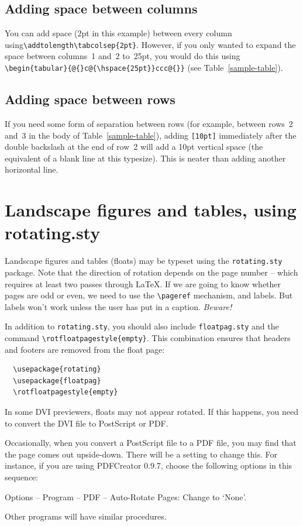 \subsection{Adding space between columns}
\label{addhoriz}
You can add space (2pt in this example) between every column using\linebreak \verb"\addtolength\tabcolsep{2pt}". However, if you only wanted to expand the space between columns~1 and~2 to~25pt, you would do this using \verb"\begin{tabular}{@{}c@{\hspace{25pt}}ccc@{}}" (see Table~\ref{sample-table}).

\subsection{Adding space between rows}
If you need some form of separation between rows (for example, between rows~2 and~3 in the body of Table~\ref{sample-table}), adding \verb"[10pt]" immediately after the double backslash at the end of row~2 will add a 10pt vertical space (the equivalent of a blank line at this typesize). This is neater than adding another horizontal line.


\section{Landscape figures and tables, using rotating.sty}

Landscape figures and tables (floats) may be typeset using the \verb"rotating.sty" package. Note that the direction of rotation depends on the page number -- which requires at least two passes through \LaTeX. If we are going to know whether pages are odd or even, we need to use the \verb"\pageref" mechanism, and labels. But labels won't work unless the user has put in a caption. \textit{Beware!}

In addition to \verb"rotating.sty", you should also include \verb"floatpag.sty" and the command \verb"\rotfloatpagestyle{empty}". This combination ensures that headers and footers are removed from the float page:
\begin{verbatim}
  \usepackage{rotating}
  \usepackage{floatpag}
  \rotfloatpagestyle{empty}
\end{verbatim}
In some DVI previewers, floats may not appear rotated. If this happens, you need to convert the DVI file to PostScript or PDF.

Occasionally, when you convert a PostScript file to a PDF file, you may find that the page comes out upside-down. There will be a setting to change this. For instance, if you are using PDFCreator 0.9.7, choose the following options in this sequence:
\begin{description}
  \item Options -- Program -- PDF -- Auto-Rotate Pages: Change to `None'.
\end{description}
Other programs will have similar procedures.

